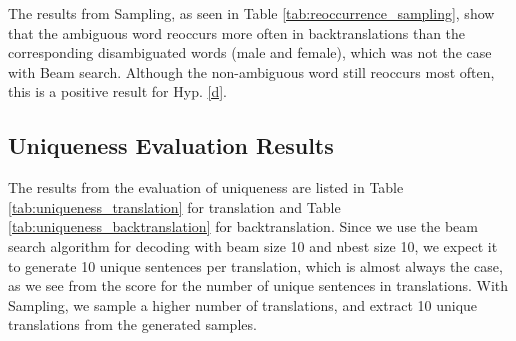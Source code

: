 The results from Sampling, as seen in Table \ref{tab:reoccurrence_sampling}, show that the ambiguous word reoccurs more often in backtranslations than the corresponding disambiguated words (male and female), which was not the case with Beam search. Although the non-ambiguous word still reoccurs most often, this is a positive result for Hyp. \ref{d}.

\subsection{Uniqueness Evaluation Results}
\label{ch:Base_Experiment:Results:Uniqueness}

The results from the evaluation of uniqueness are listed in Table \ref{tab:uniqueness_translation} for translation and Table \ref{tab:uniqueness_backtranslation} for backtranslation.
Since we use the beam search algorithm for decoding with beam size 10 and nbest size 10, we expect it to generate 10 unique sentences per translation, which is almost always the case, as we see from the score for the number of unique sentences in translations. With Sampling, we sample a higher number of translations, and extract 10 unique translations from the generated samples.

